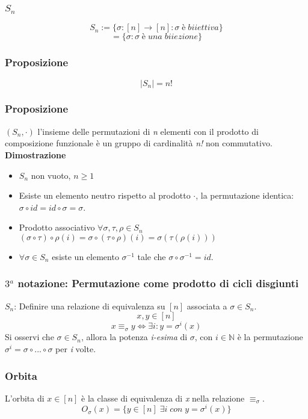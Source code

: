 \subsubsection{\(S_n\)}
\[S_n:=\{\sigma : [n]\rightarrow[n] : \sigma\;è\;biiettiva\}\]
\[=\{\sigma : \sigma\;è\;una\;biiezione\}\]

\subsubsection{Proposizione}
\[|S_n|=n!\]

\subsubsection{Proposizione}
\((S_n,\cdot)\) l'insieme delle permutazioni di \textit{n} elementi con il prodotto di composizione funzionale è un gruppo di cardinalità \textit{n!} non commutativo.
\\
\textbf{Dimostrazione}
\begin{itemize}
    \item \(S_n\) non vuoto, \(n\geq 1\)
    
    \item Esiste un elemento neutro rispetto al prodotto \(\cdot\), la permutazione identica: \(\sigma\circ id=id\circ\sigma=\sigma\).
    
    \item Prodotto associativo \(\forall\sigma ,\tau ,\rho\in S_n\) \((\sigma\circ \tau )\circ\rho (i)=\sigma\circ (\tau\circ\rho )(i)=\sigma ( \tau (\rho (i)))\)
    
    \item \(\forall\sigma\in S_n\) esiste un elemento \(\sigma ^{-1}\) tale che \(\sigma\circ\sigma ^{-1}=id\).
\end{itemize}

\subsubsection{\(3^a\) notazione: Permutazione come prodotto di cicli disgiunti}
\(S_n\): Definire una relazione di equivalenza su \([n]\) associata a \(\sigma \in S_n\).
\[x,y\in [n]\]
\[x\equiv _\sigma y\Leftrightarrow \exists i : y=\sigma ^i(x)\]
Si osservi che \(\sigma\in S_n\), allora la potenza \textit{i-esima} di \(\sigma\), con \(i\in\mathbb{N}\) è la permutazione \(\sigma ^i =\sigma\circ ...\circ\sigma\) per \textit{i} volte.

 \subsubsection{Orbita} L'orbita di \(x\in [n]\) è la classe di equivalenza di \textit{x} nella relazione \(\equiv _\sigma\). \[O_\sigma (x) =\{y\in [n]\;\exists i\;con\;y=\sigma ^i(x)\}\]


